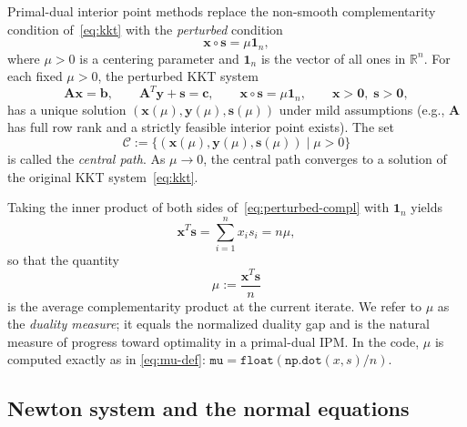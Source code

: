 \documentclass[11pt,twoside]{article}
\newcommand{\R}{\mathbb{R}}
\newcommand{\bA}{\mathbf{A}}
\newcommand{\bb}{\mathbf{b}}
\newcommand{\bc}{\mathbf{c}}
\newcommand{\bx}{\mathbf{x}}
\newcommand{\by}{\mathbf{y}}
\newcommand{\bs}{\mathbf{s}}
\begin{document}
Primal-dual interior point methods replace the non-smooth
complementarity condition of~\eqref{eq:kkt} with the \emph{perturbed}
condition
\begin{equation}
  \bx \circ \bs = \mu \mathbf{1}_n,
  \label{eq:perturbed-compl}
\end{equation}
where $\mu > 0$ is a centering parameter and $\mathbf{1}_n$ is the vector
of all ones in $\R^n$.  For each fixed $\mu > 0$, the perturbed KKT system
\begin{equation}
  \bA\bx = \bb,\qquad
  \bA^T\by + \bs = \bc,\qquad
  \bx \circ \bs = \mu \mathbf{1}_n,\qquad
  \bx > \mathbf{0},\; \bs > \mathbf{0},
  \label{eq:perturbed-kkt}
\end{equation}
has a unique solution $(\bx(\mu), \by(\mu), \bs(\mu))$ under mild
assumptions (e.g., $\bA$ has full row rank and a strictly feasible
interior point exists).  The set
\begin{equation}
  \mathcal{C} := \bigl\{ (\bx(\mu), \by(\mu), \bs(\mu)) \mid \mu > 0 \bigr\}
\end{equation}
is called the \emph{central path}.  As $\mu \to 0$, the central path
converges to a solution of the original KKT system~\eqref{eq:kkt}.

Taking the inner product of both sides of~\eqref{eq:perturbed-compl} with
$\mathbf{1}_n$ yields
\begin{equation}
  \bx^T\bs = \sum_{i=1}^n x_i s_i = n\mu,
  \label{eq:duality-gap}
\end{equation}
so that the quantity
\begin{equation}
  \mu := \frac{\bx^T\bs}{n}
  \label{eq:mu-def}
\end{equation}
is the average complementarity product at the current iterate.  We refer
to $\mu$ as the \emph{duality measure}; it equals the normalized duality
gap and is the natural measure of progress toward optimality in a
primal-dual IPM.  In the code, $\mu$ is computed exactly as in
\eqref{eq:mu-def}: $\texttt{mu} = \texttt{float}(\texttt{np.dot}(x, s) /
n)$.

\subsection{Newton system and the normal equations}
\end{document}
